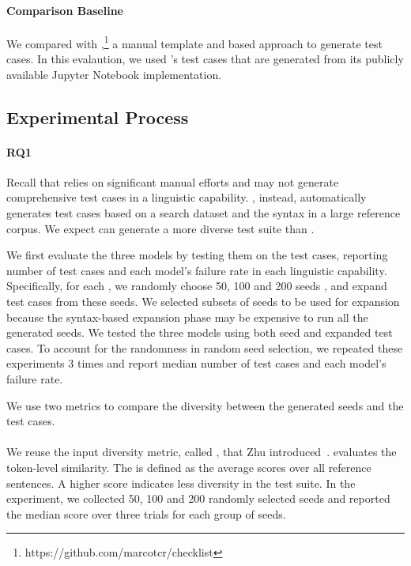 \paragraph*{\textbf{Comparison Baseline}}
We compared \tool with
\Cklst,\footnote{https://github.com/marcotcr/checklist} a
manual template and \lc based approach to generate test cases. In this evalaution, we used \Cklst's \sa test cases that are
generated from its publicly available Jupyter Notebook implementation.

\subsection{Experimental Process}

\paragraph*{\textbf{RQ1}}
Recall that \Cklst relies on significant manual efforts and may not generate comprehensive test cases in a linguistic capability. \tool, instead, automatically generates test cases based on a search
dataset and the syntax in a large reference corpus. 
We expect \tool can generate a more diverse test suite than \Cklst.

We first evaluate the three \sa models by testing them on the \tool  test cases, reporting number of test cases and each model's failure rate in each linguistic capability. Specifically, for each \lc, we randomly choose 50, 100 and 200 seeds , and expand test cases from these seeds. We selected subsets of seeds to be used for expansion because the syntax-based expansion phase may be expensive to run all the generated seeds. We tested the three models using both seed and expanded test cases. To account for the randomness in random seed selection, we repeated these experiments 3 times and report median number of test cases and each model's failure rate.

We use two metrics to compare the diversity between the \tool generated seeds and the \Cklst test cases.

\paragraph*{\selfbleu} We reuse the input diversity metric, 
called \selfbleu, that Zhu \etal introduced~\cite{zhu2018texygen}. \bleu evaluates the token-level similarity.
The \selfbleu is defined as the average \bleu scores over all reference sentences.
A higher \selfbleu score indicates less diversity in the test suite. In the experiment, we collected 50, 100 and 200 randomly selected \tool seeds and reported the median \selfbleu score over three trials for each group of seeds.

